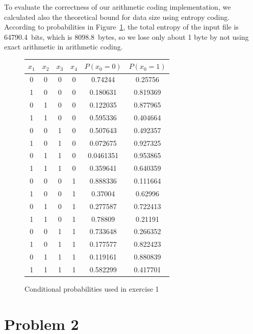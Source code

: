 \documentclass{article}
\begin{document}
To evaluate the correctness of our arithmetic coding implementation, we calculated also the theoretical bound for data size using entropy coding.
According to probabilities in Figure~\ref{ex1_probs}, the total entropy of the input file is 64790.4~bits, which is 8098.8~bytes, so we lose only about 1 byte by not using exact arithmetic in arithmetic coding.


\begin{figure}

\begin{center}
\begin{tabular}{|c|c|c|c|c|c|}
\hline
$x_1$ & $x_2$ & $x_3$ & $x_4$ & $P(x_0 = 0)$ & $P(x_0 = 1) $ \\ \hline
   0 & 0 & 0 & 0 & 0.74244 & 0.25756 \\ \hline
   1 & 0 & 0 & 0 & 0.180631 & 0.819369 \\ \hline
   0 & 1 & 0 & 0 & 0.122035 & 0.877965 \\ \hline
   1 & 1 & 0 & 0 & 0.595336 & 0.404664 \\ \hline
   0 & 0 & 1 & 0 & 0.507643 & 0.492357 \\ \hline
   1 & 0 & 1 & 0 & 0.072675 & 0.927325 \\ \hline
   0 & 1 & 1 & 0 & 0.0461351 & 0.953865 \\ \hline
   1 & 1 & 1 & 0 & 0.359641 & 0.640359 \\ \hline
   0 & 0 & 0 & 1 & 0.888336 & 0.111664 \\ \hline
   1 & 0 & 0 & 1 & 0.37004 & 0.62996 \\ \hline
   0 & 1 & 0 & 1 & 0.277587 & 0.722413 \\ \hline
   1 & 1 & 0 & 1 & 0.78809 & 0.21191 \\ \hline
   0 & 0 & 1 & 1 & 0.733648 & 0.266352 \\ \hline
   1 & 0 & 1 & 1 & 0.177577 & 0.822423 \\ \hline
   0 & 1 & 1 & 1 & 0.119161 & 0.880839 \\ \hline
   1 & 1 & 1 & 1 & 0.582299 & 0.417701 \\ \hline
\end{tabular}
\end{center}
\caption{Conditional probabilities used in exercise 1}
\label{ex1_probs}
\end{figure}

\section{Problem 2}
\end{document}

